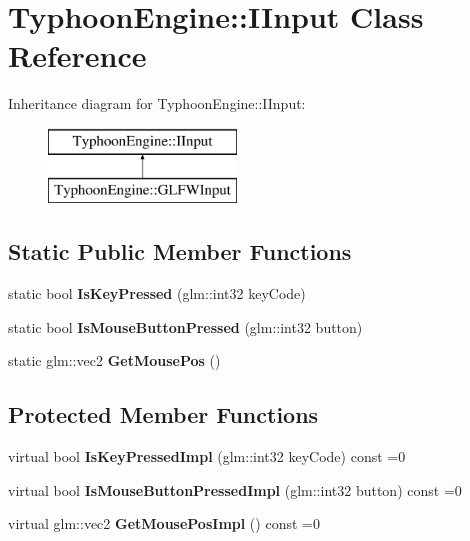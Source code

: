 \hypertarget{class_typhoon_engine_1_1_i_input}{}\section{Typhoon\+Engine\+::I\+Input Class Reference}
\label{class_typhoon_engine_1_1_i_input}
Inheritance diagram for Typhoon\+Engine\+::I\+Input\+:\begin{figure}[H]
\begin{center}
\leavevmode
\includegraphics[height=2.000000cm]{class_typhoon_engine_1_1_i_input}
\end{center}
\end{figure}
\subsection*{Static Public Member Functions}
\begin{DoxyCompactItemize}
\item 
\mbox{\label{class_typhoon_engine_1_1_i_input_aa23756a5d36cb605b5dc9435d3af8895}} 
static bool {\bfseries Is\+Key\+Pressed} (glm\+::int32 key\+Code)
\item 
\mbox{\label{class_typhoon_engine_1_1_i_input_aedc332837c6efc977d263264eb6f13bb}} 
static bool {\bfseries Is\+Mouse\+Button\+Pressed} (glm\+::int32 button)
\item 
\mbox{\label{class_typhoon_engine_1_1_i_input_ad5c0568fd8f9c7430c323c2a71a52387}} 
static glm\+::vec2 {\bfseries Get\+Mouse\+Pos} ()
\end{DoxyCompactItemize}
\subsection*{Protected Member Functions}
\begin{DoxyCompactItemize}
\item 
\mbox{\label{class_typhoon_engine_1_1_i_input_ae561a7ac6d4d8eb4f3004af749ee3236}} 
virtual bool {\bfseries Is\+Key\+Pressed\+Impl} (glm\+::int32 key\+Code) const =0
\item 
\mbox{\label{class_typhoon_engine_1_1_i_input_a67fe301ad77fac55a7e318e3018a21d0}} 
virtual bool {\bfseries Is\+Mouse\+Button\+Pressed\+Impl} (glm\+::int32 button) const =0
\item 
\mbox{\label{class_typhoon_engine_1_1_i_input_a49cefc458f7c1f4990e0652c70f6ad0c}} 
virtual glm\+::vec2 {\bfseries Get\+Mouse\+Pos\+Impl} () const =0
\end{DoxyCompactItemize}


